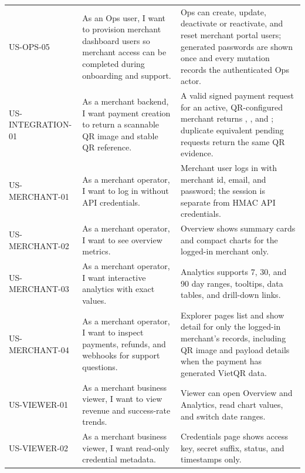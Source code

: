 \begin{longtable}{L{0.17\textwidth}L{0.37\textwidth}L{0.36\textwidth}}
\bodyrowrule
US-OPS-05 & As an Ops user, I want to provision merchant dashboard users so merchant access can be completed during onboarding and support. & Ops can create, update, deactivate or reactivate, and reset merchant portal users; generated passwords are shown once and every mutation records the authenticated Ops actor. \\
\bodyrowrule
US-INTEGRATION-01 & As a merchant backend, I want payment creation to return a scannable QR image and stable QR reference. & A valid signed payment request for an active, QR-configured merchant returns , , and ; duplicate equivalent pending requests return the same QR evidence. \\
\bodyrowrule
US-MERCHANT-01 & As a merchant operator, I want to log in without API credentials. & Merchant user logs in with merchant id, email, and password; the session is separate from HMAC API credentials. \\
\bodyrowrule
US-MERCHANT-02 & As a merchant operator, I want to see overview metrics. & Overview shows summary cards and compact charts for the logged-in merchant only. \\
\bodyrowrule
US-MERCHANT-03 & As a merchant operator, I want interactive analytics with exact values. & Analytics supports 7, 30, and 90 day ranges, tooltips, data tables, and drill-down links. \\
\bodyrowrule
US-MERCHANT-04 & As a merchant operator, I want to inspect payments, refunds, and webhooks for support questions. & Explorer pages list and show detail for only the logged-in merchant's records, including QR image and payload details when the payment has generated VietQR data. \\
\bodyrowrule
US-VIEWER-01 & As a merchant business viewer, I want to view revenue and success-rate trends. & Viewer can open Overview and Analytics, read chart values, and switch date ranges. \\
\bodyrowrule
US-VIEWER-02 & As a merchant business viewer, I want read-only credential metadata. & Credentials page shows access key, secret suffix, status, and timestamps only. \\
\bottomrule
\end{longtable}
